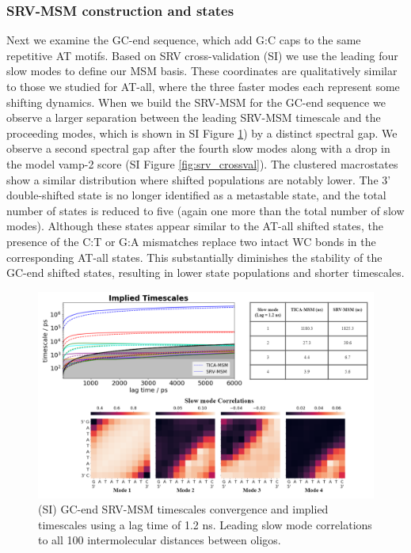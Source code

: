 \documentclass[journal=jpcbfk,manuscript=article]{achemso}
\begin{document}
\subsubsection{SRV-MSM construction and states}
	
Next we examine the GC-end sequence, which add G:C caps to the same repetitive AT motifs. Based on SRV cross-validation (SI) we use the leading four slow modes to define our MSM basis.  These coordinates are qualitatively similar to those we studied for AT-all, where the three faster modes each represent some shifting dynamics. When we build the SRV-MSM for the GC-end sequence we observe a larger separation between the leading SRV-MSM timescale and the proceeding modes, which is shown in SI Figure \ref{fig:GC-end_dynamic}) by a distinct spectral gap. We observe a second spectral gap after the fourth slow modes along with a drop in the model vamp-2 score (SI Figure \ref{fig:srv_crossval}). The clustered macrostates show a similar distribution where shifted populations are notably lower. The 3' double-shifted state is no longer identified as a metastable state, and the total number of states is reduced to five (again one more than the total number of slow modes). Although these states appear similar to the AT-all shifted states, the presence of the C:T or G:A mismatches replace two intact WC bonds in the corresponding AT-all states. This substantially diminishes the stability of the GC-end shifted states, resulting in lower state populations and shorter timescales.

\begin{figure}[ht!]
	\begin{center}
        \includegraphics[width=\textwidth]{Figs/figs_0804/GC-end_dynamic.png}
        \caption{(SI) GC-end SRV-MSM timescales convergence and implied timescales using a lag time of 1.2 ns. Leading slow mode correlations to all 100 intermolecular distances between oligos.}
        \label{fig:GC-end_dynamic}
	\end{center}
\end{figure}
\end{document}
